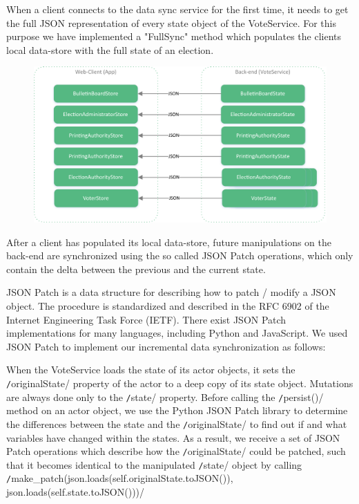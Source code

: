 When a client connects to the data sync service for the first time, it needs to get the full JSON representation of every state object of the VoteService. For this purpose we have implemented a "{}FullSync"{} method which populates the clients local data-store with the full state of an election.

\begin{figure}
\begin{center}
\includegraphics[scale=0.62]{assets/datastores.pdf}
\label{Datastores}%
\end{center}
\end{figure}
After a client has populated its local data-store, future manipulations on the back-end are synchronized using the so called JSON Patch operations, which only contain the delta between the previous and the current state.

JSON Patch is a data structure for describing how to patch / modify a JSON object. The procedure is standardized and described in the RFC 6902 of the Internet Engineering Task Force (IETF). There exist JSON Patch implementations for many languages, including Python and JavaScript. We used JSON Patch to implement our incremental data synchronization as follows:

When the VoteService loads the state of its actor objects, it sets the \texttt/originalState/ property of the actor to a deep copy of its state object. Mutations are always done only to the \texttt/state/ property. Before calling the \texttt/persist()/ method on an actor object, we use the Python JSON Patch library to determine the differences between the state and the \texttt/originalState/ to find out if and what variables have changed within the states. As a result, we receive a set of JSON Patch operations which describe how the \texttt/originalState/ could be patched, such that it becomes identical to the manipulated \texttt/state/ object by calling 
\\ \texttt/make_patch(json.loads(self.originalState.toJSON()), json.loads(self.state.toJSON()))/


